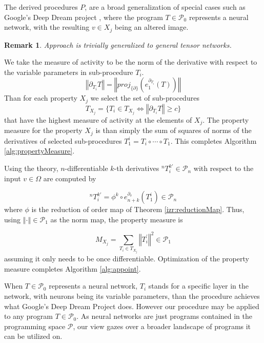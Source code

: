 \documentclass{article}
\newcommand{\dP}{\mathcal{P}}
\newcommand{\D}{\partial}
\newtheorem{opomba}{Remark}[section]
\begin{document}
   The derived procedures $P$, are a broad generalization of special cases such as Google's Deep Dream project \cite{DeepDream}, where the program $T\in\dP_0$ represents a neural network, with the resulting $v\in X_j$ being an altered image.
   
   \begin{opomba}
      Approach is trivially generalized to general tensor networks.
      \end{opomba}
   
   We take the measure of activity to be the norm of the derivative with respect to the variable parameters in sub-procedure $T_i$.
   $$\left\Vert\D_{T_i}T\right\Vert=\left\Vert proj_{\{\D\}}\left(e^{\D_{T_i}}_1(T)\right)\right\Vert$$
   Than for each property $X_j$ we select the set of sub-procedures 
   $$T_{X_j}=\{T_i\in T_{X_j}\iff \left\Vert\D_{T_i}T\right\Vert\ge c\}$$
   that have the highest measure of activity at the elements of $X_j$. The property measure for the property $X_j$ is than simply the sum of squares of norms of the derivatives of selected sub-procedures $T^i_1=T_i\circ\cdots\circ T_1$. This completes Algorithm \ref{alg:propertyMeasure}. 
   
   Using the theory, $n$-differentiable $k$-th derivatives $^{n}T^{k\prime}_i\in\dP_n$ with respect to the input $v\in\Omega$ are computed by
   
   \begin{equation}
   ^{n}T^{k\prime}_i=\phi^k\circ e^{\D_v}_{n+k}(T^i_1)\in\dP_n
   \end{equation}
   where $\phi$ is the reduction of order map of Theorem \ref{izr:reductionMap}.
   Thus, using $\left\Vert\cdot\right\Vert\in\dP_1$ as the norm map, the property measure is
   
   \begin{equation}
   M_{X_j}=\sum\limits_{T_i\in T_{X_j}} \left\Vert T^\prime_i\right\Vert^2\in\dP_1
   \end{equation}
   assuming it only needs to be once differentiable. Optimization of the property measure completes Algorithm \ref{alg:appoint}.
   
   When $T\in\dP_0$ represents a neural network, $T_i$ stands for a specific layer in the network, with neurons being its variable parameters, than the procedure achieves what Google's Deep Dream Project \cite{DeepDream} does. However our procedure may be applied to any program $T\in\dP_0$. As neural networks are just programs contained in the programming space $\dP$, our view gazes over a broader landscape of programs it can be utilized on.
   
\end{document}
